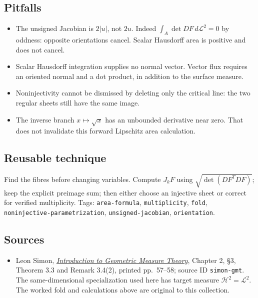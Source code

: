 \documentclass[
  11pt,
]{article}
\providecommand{\tightlist}{%
  \setlength{\itemsep}{0pt}\setlength{\parskip}{0pt}}
\begin{document}
\subsection{Pitfalls}\label{pitfalls-10}

\begin{itemize}
\tightlist
\item
  The unsigned Jacobian is \(2|u|\), not \(2u\). Indeed
  \(\int_A\det DF\,d\mathcal L^2=0\) by oddness: opposite orientations
  cancel. Scalar Hausdorff area is positive and does not cancel.
\item
  Scalar Hausdorff integration supplies no normal vector. Vector flux
  requires an oriented normal and a dot product, in addition to the
  surface measure.
\item
  Noninjectivity cannot be dismissed by deleting only the critical line:
  the two regular sheets still have the same image.
\item
  The inverse branch \(x\mapsto\sqrt x\) has an unbounded derivative
  near zero. That does not invalidate this forward Lipschitz area
  calculation.
\end{itemize}

\subsection{Reusable technique}\label{reusable-technique-10}

Find the fibres before changing variables. Compute \(J_kF\) using
\(\sqrt{\det(DF^TDF)}\); keep the explicit preimage sum; then either
choose an injective sheet or correct for verified multiplicity. Tags:
\texttt{area-\allowbreak{}formula}, \texttt{multiplicity}, \texttt{fold},
\texttt{noninjective-\allowbreak{}parametrization}, \texttt{unsigned-\allowbreak{}jacobian},
\texttt{orientation}.

\subsection{Sources}\label{sources-10}

\begin{itemize}
\tightlist
\item
  Leon Simon,
  \href{https://math.stanford.edu/~lms/ntu-gmt-text.pdf}{\emph{Introduction
  to Geometric Measure Theory}}, Chapter 2, §3, Theorem 3.3 and Remark
  3.4(2), printed pp.~57--58; source ID \texttt{simon-\allowbreak{}gmt}. The
  same-dimensional specialization used here has target measure
  \(\mathcal H^2=\mathcal L^2\). The worked fold and calculations above
  are original to this collection.
\end{itemize}
\end{document}
